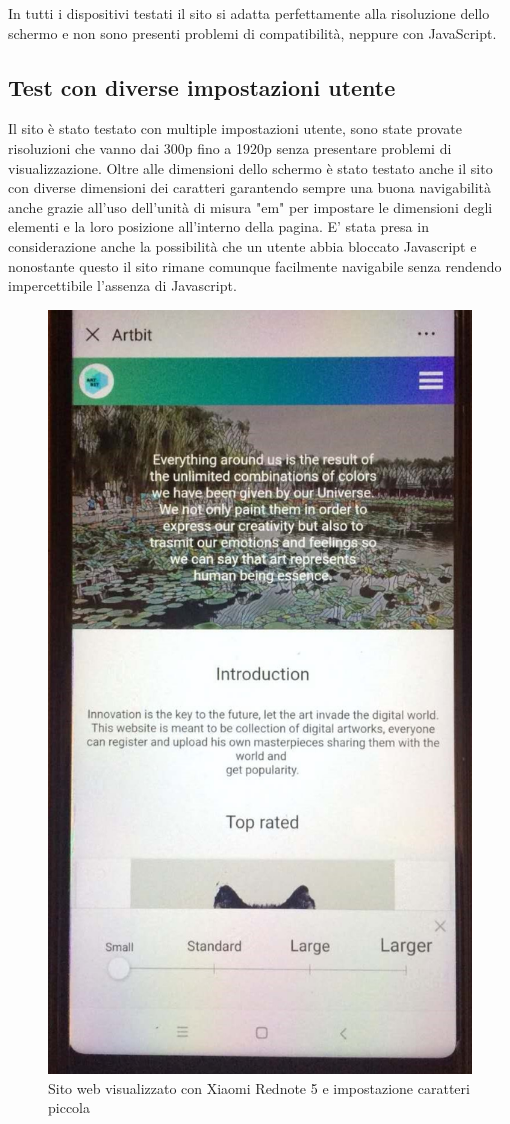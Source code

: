 \documentclass[openany, a4paper, 12pt]{report}
\begin{document}
				In tutti i dispositivi testati il sito si adatta perfettamente alla risoluzione dello schermo e non sono presenti problemi di compatibilità, neppure con JavaScript.\\
				\subsection{Test con diverse impostazioni utente}
				Il sito è stato testato con multiple impostazioni utente, sono state provate risoluzioni che vanno dai 300p fino a 1920p senza presentare problemi di visualizzazione. Oltre alle dimensioni dello schermo è stato testato anche il sito con diverse dimensioni dei caratteri garantendo sempre una buona navigabilità anche grazie all'uso dell'unità di misura "em" per impostare le dimensioni degli elementi e la loro posizione all'interno della pagina. E' stata presa in considerazione anche la possibilità che un utente abbia bloccato Javascript e nonostante questo il sito rimane comunque facilmente navigabile senza rendendo impercettibile l'assenza di Javascript.
			\begin{figure}[H]
				\centering
				\includegraphics[width=0.5\linewidth]{images/small_font}
				\caption{Sito web visualizzato con Xiaomi Rednote 5 e impostazione caratteri piccola}
			\end{figure}
\end{document}
